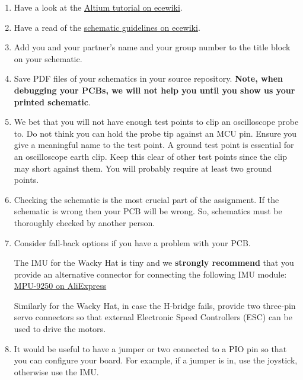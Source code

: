 \documentclass[11pt, a4paper]{article}
\begin{document}
\begin{enumerate}
\item Have a look at the
  \href{http://ecewiki.elec.canterbury.ac.nz/mediawiki/index.php/ENCE461_Altium_tutorial}{Altium
    tutorial on ecewiki}.

\item Have a read of the
  \href{http://ecewiki.elec.canterbury.ac.nz/mediawiki/index.php/Schematic_guidelines}{schematic
    guidelines on ecewiki}.

\item Add you and your partner's name and your group number to the
  title block on your schematic.

\item Save PDF files of your schematics in your source repository.
  \textbf{Note, when debugging your PCBs, we will not help you until
    you show us your printed schematic}.

\item We bet that you will not have enough test points to clip an
  oscilloscope probe to.  Do not think you can hold the probe tip
  against an MCU pin.  Ensure you give a meaningful name to the test
  point.  A ground test point is essential for an oscilloscope earth
  clip. Keep this clear of other test points since the clip may short
  against them.  You will probably require at least two ground points.
  
\item Checking the schematic is the most crucial part of the
  assignment.  If the schematic is wrong then your PCB will be wrong.
  So, schematics must be thoroughly checked by another person.

\item Consider fall-back options if you have a problem with your PCB.

  The IMU for the Wacky Hat is tiny and we \textbf{strongly recommend} that you
  provide an alternative connector for connecting the following IMU module:
  \href{https://www.aliexpress.com/item/SPI-IIC-MPU9250-MPU-9250-MPU-9250-9-Axis-Attitude-Gyro-Accelerator-Magnetometer-Sensor-Module-MPU9250/32216818498.html?spm=a2g0s.9042311.0.0.WKvtEm}{MPU-9250 on AliExpress}

  Similarly for the Wacky Hat, in case the H-bridge fails, provide two
  three-pin servo connectors so that external Electronic Speed
  Controllers (ESC) can be used to drive the motors.

\item It would be useful to have a jumper or two connected to a PIO
  pin so that you can configure your board.  For example, if a jumper
  is in, use the joystick, otherwise use the IMU.
  
\end{enumerate}
\end{document}

